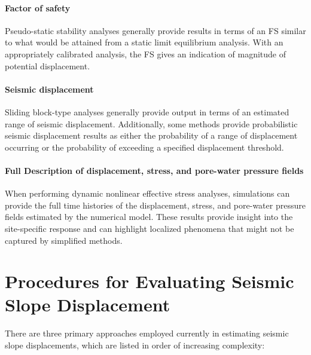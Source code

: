 \paragraph{Factor of safety}
Pseudo-static stability analyses generally provide results in terms of an FS similar to what would be attained from a static limit equilibrium analysis. With an appropriately calibrated analysis, the FS gives an indication of magnitude of potential displacement.

\paragraph{Seismic displacement}
Sliding block-type analyses generally provide output in terms of an estimated range of seismic displacement. Additionally, some methods provide probabilistic seismic displacement results as either the probability of a range of displacement occurring or the probability of exceeding a specified displacement threshold.

\paragraph{Full Description of displacement, stress, and pore-water pressure fields}
When performing dynamic nonlinear effective stress analyses, simulations can provide the full time histories of the displacement, stress, and pore-water pressure fields estimated by the numerical model. These results provide insight into the site-specific response and can highlight localized phenomena that might not be captured by simplified methods.

\section{Procedures for Evaluating Seismic Slope Displacement}
\label{sec:eq_landslide_methods}

There are three primary approaches employed currently in estimating seismic slope displacements, which are listed in order of increasing complexity:


